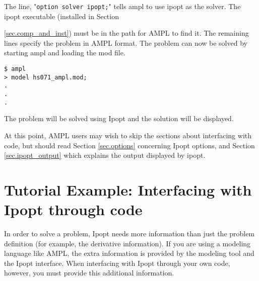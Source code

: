 \documentclass[letter,10pt]{article}
\begin{document}
The line, "{\tt option solver ipopt;}" tells ampl to use ipopt as the
solver. The ipopt executable (installed in Section
{\ref{sec.comp_and_inst}) must be in the path for AMPL to find it. The
remaining lines specify the problem in AMPL format. The problem can
now be solved by starting ampl and loading the mod file.
\begin{verbatim}
$ ampl
> model hs071_ampl.mod;
.
.
.
\end{verbatim}
The problem will be solved using Ipopt and the solution will be
displayed.

At this point, AMPL users may wish to skip the sections about
interfacing with code, but should read Section \ref{sec.options}
concerning Ipopt options, and Section \ref{sec.ipopt_output} which
explains the output displayed by ipopt.

\section{Tutorial Example: Interfacing with Ipopt through code}
In order to solve a problem, Ipopt needs more information than just
the problem definition (for example, the derivative information). If
you are using a modeling language like AMPL, the extra information is
provided by the modeling tool and the Ipopt interface. When
interfacing with Ipopt through your own code, however, you must
provide this additional information.

}
\end{document}
